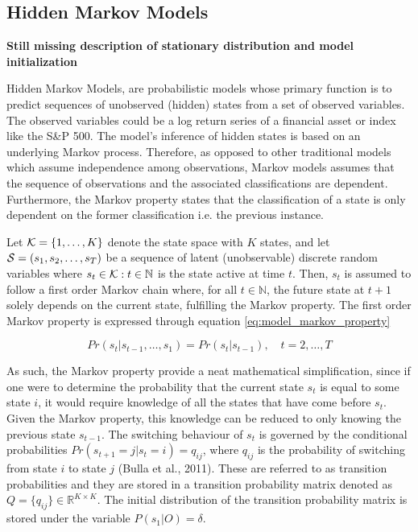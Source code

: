 \subsection{Hidden Markov Models}
\label{subsection: HMM}

\textbf{Still missing description of stationary distribution and model initialization}

Hidden Markov Models, are probabilistic models whose primary function is to predict sequences of unobserved (hidden) states from a set of observed variables. The observed variables could be a log return series of a financial asset or index like the S\&P 500. The model’s inference of hidden states is based on an underlying Markov process. Therefore, as opposed to other traditional models which assume independence among observations, Markov models assumes that the sequence of observations and the associated classifications are dependent. Furthermore, the Markov property states that the classification of a state is only dependent on the former classification i.e. the previous instance. 

Let $\K=\{ 1,\ldots, K \}$ denote the state space with $K$ states, and let $\S=(s_1,s_2,\ldots,s_T)$ be a sequence of latent (unobservable) discrete random variables where $s_t\in\K: t\in \mathbb{N}$ is the state active at time $t$. Then, $s_t$ is assumed to follow a first order Markov chain where, for all $t \in \mathbb{N}$, the future state at $t + 1$ solely depends on the current state, fulfilling the Markov property. The first order Markov property is expressed through equation \ref{eq:model_markov_property}

\begin{equation}
    Pr(s_t | s_{t-1},\ldots,s_1) = Pr(s_t | s_{t-1}),
    \quad t=2,\ldots,T
    \label{eq:model_markov_property}
\end{equation} 

As such, the Markov property provide a neat mathematical simplification, since if one were to determine the probability that the current state $s_t$ is equal to some state $i$, it would require knowledge of all the states that have come before $s_t$. Given the Markov property, this knowledge can be reduced to only knowing the previous state $s_{t-1}$. The switching behaviour of $s_t$ is governed by the conditional probabilities $Pr(s_{t+1} = j| s_t = i) = q_{ij}$, where $q_{ij}$ is the probability of switching from state $i$ to state $j$ (Bulla et al., 2011). These are referred to as transition probabilities and they are stored in a transition probability matrix denoted as $Q = \{q_{ij}\} \in \mathbb{R}^{K \times K}$. The initial distribution of the transition probability matrix is stored under the variable $P(s_1|O)= \delta$.

